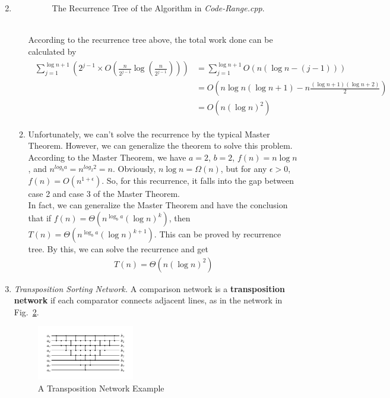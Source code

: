 \documentclass[12pt,a4paper]{article}
\makeatletter
\newtheorem*{solution}{Solution}
\theoremstyle{definition}
\renewenvironment{solution}[1][Solution] {\par\pushQED{\qed}\normalfont\topsep6\p@\@plus6\p@\relax\trivlist\item[\hskip\labelsep\bfseries#1\@addpunct{.}]\ignorespaces}{\popQED\endtrivlist\@endpefalse} \makeatother
\makeatother
\begin{document}
\begin{enumerate}
\begin{solution}
\begin{enumerate}
\begin{figure}[htbp]
    \caption{The Recurrence Tree of the Algorithm in \emph{Code-Range.cpp}.}\label{Fig-Transposition}
    \end{figure}
    ~\\
    According to the recurrence tree above, the total work done can be calculated by
    \begin{align}
        \begin{split}
            \sum_{j=1}^{\log n+1}(2^{j-1}\times O(\frac{n}{2^{j-1}}\log(\frac{n}{2^{j-1}}))) &= \sum_{j=1}^{\log n+1}O(n(\log n -(j-1)))\\
        &= O(n\log n(\log n+1)-n\frac{(\log n+1)(\log n +2)}{2})\\
        &= O(n(\log n)^2)
        \end{split}
    \end{align}
    \item Unfortunately, we can't solve the recurrence by the typical Master Theorem. However, we can generalize the theorem to solve this problem.\\
    According to the Master Theorem, we have $a = 2$, $b=2$, $f(n) = n\log n$, and $n^{log_{b}{a}} = n^{log_{2}{2}} = n$. Obviously, $n\log n = \Omega(n)$, but for any $\epsilon>0$, $f(n) = O(n^{1+\epsilon})$. So, for this recurrence, it falls into the gap between case 2 and case 3 of the Master Theorem. \\
    In fact, we can generalize the Master Theorem and have the conclusion that if $f(n) = \Theta(n^{\log_{b}a}(\log n)^k)$, then $T(n) = \Theta(n^{\log_{b}a}(\log n)^{k+1})$. This can be proved by recurrence tree. By this, we can solve the recurrence and get
    \begin{align}
        T(n) = \Theta(n(\log n)^2)
    \end{align}
\end{enumerate}
\end{solution}
\item
\textit{Transposition Sorting Network.} A comparison network is a \textbf{transposition network}  if each comparator connects adjacent lines, as in the network in Fig.~\ref{Fig-Transposition}.

\begin{figure}[htbp]
    \centering
    \includegraphics[width=0.4\textwidth]{Fig-Transposition.pdf}
    \caption{A Transposition Network Example}\label{Fig-Transposition}
\end{figure}


\end{enumerate}
\end{document}
